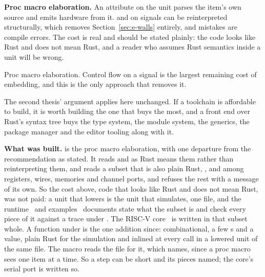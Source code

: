 \textbf{Proc macro elaboration.} An attribute on the unit parses the item's
own source and emits hardware from it.  and  on
signals can be reinterpreted structurally, which removes
Section~\ref{sec:e-walls} entirely, and mistakes are compile errors. The
cost is real and should be stated plainly: the code looks like Rust and
does not mean Rust, and a reader who assumes Rust semantics inside a unit
will be wrong.

\begin{rulebox}[Recommendation]
Proc macro elaboration. Control flow on a signal is the largest remaining
cost of embedding, and this is the only approach that removes it.
\end{rulebox}

The second thesis' argument applies here unchanged. If a toolchain is
affordable to build, it is worth building the one that buys the most, and a
front end over Rust's syntax tree buys the type system, the module system,
the generics, the package manager and the editor tooling along with it.

\textbf{What was built.} \code{\#[lower]} is the proc macro
elaboration, with one departure from the recommendation as stated.
It reads  and  as Rust means them rather than
reinterpreting them, and reads a subset that is also plain Rust,
,  and  among registers,
wires, memories and channel ports, and refuses the rest with a message
of its own. So the cost above,
code that looks like Rust and does not mean Rust, was not paid: a
unit that lowers is the unit that simulates, one file, and the
runtime~\cite{runtime} and examples~\cite{examples} documents state
what the subset is and check every piece of it against a trace under
. The RISC-V core~\cite{vreteno} is written in that subset
whole. A function under \code{\#[lower]} is the one addition since:
combinational, a few s and a value, plain Rust for the
simulation and inlined at every call in a lowered unit of the same
file. The macro reads the file for it, which
 names, since a proc macro sees one item at
a time. So a step can be short and its pieces named; the core's
serial port is written so.
